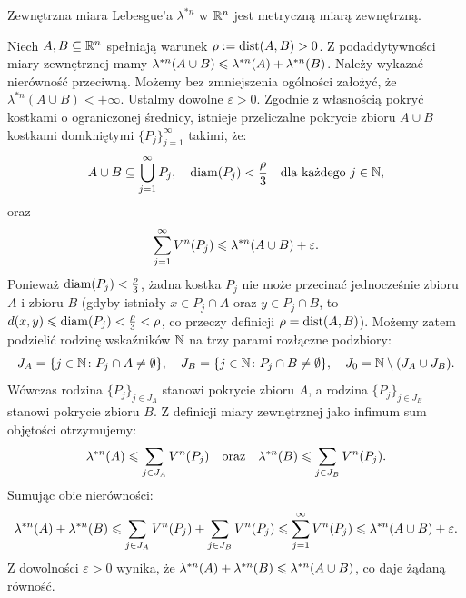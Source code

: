 \begin{tw}

    Zewnętrzna miara Lebesgue'a $\lambda^{*n}$ w $\mathbb{R}^{n}$ jest metryczną miarą zewnętrzną.

\end{tw}
\begin{dow} Niech $A, B \subseteq \mathbb{R}^{n}$ spełniają warunek $\rho := \operatorname{dist}(A, B) > 0$. Z podaddytywności miary zewnętrznej mamy $\lambda^{*n}(A \cup B) \leqslant \lambda^{*n}(A) + \lambda^{*n}(B)$. Należy wykazać nierówność przeciwną. Możemy bez zmniejszenia ogólności założyć, że $\lambda^{*n}(A \cup B) < +\infty$. Ustalmy dowolne $\varepsilon > 0$. Zgodnie z własnością pokryć kostkami o ograniczonej średnicy, istnieje przeliczalne pokrycie zbioru $A \cup B$ kostkami domkniętymi $\{P_j\}_{j=1}^\infty$ takimi, że:
    \begin{equation*}
        A \cup B \subseteq \bigcup_{j=1}^\infty P_j, \quad \operatorname{diam}(P_j) < \frac{\rho}{3} \quad \text{dla każdego } j \in \mathbb{N},
    \end{equation*}
    oraz
    \begin{equation*}
        \sum_{j=1}^\infty V^n(P_j) \leqslant \lambda^{*n}(A \cup B) + \varepsilon.
    \end{equation*}
    Ponieważ $\operatorname{diam}(P_j) < \frac{\rho}{3}$, żadna kostka $P_j$ nie może przecinać jednocześnie zbioru $A$ i zbioru $B$ (gdyby istniały $x \in P_j \cap A$ oraz $y \in P_j \cap B$, to $d(x, y) \leqslant \operatorname{diam}(P_j) < \frac{\rho}{3} < \rho$, co przeczy definicji $\rho = \operatorname{dist}(A, B)$). Możemy zatem podzielić rodzinę wskaźników $\mathbb{N}$ na trzy parami rozłączne podzbiory:
    \begin{equation*}
        J_A = \{j \in \mathbb{N} \colon P_j \cap A \neq \emptyset\}, \quad J_B = \{j \in \mathbb{N} \colon P_j \cap B \neq \emptyset\}, \quad J_0 = \mathbb{N} \setminus (J_A \cup J_B).
    \end{equation*}
    Wówczas rodzina $\{P_j\}_{j \in J_A}$ stanowi pokrycie zbioru $A$, a rodzina $\{P_j\}_{j \in J_B}$ stanowi pokrycie zbioru $B$. Z definicji miary zewnętrznej jako infimum sum objętości otrzymujemy:
    \begin{equation*}
        \lambda^{*n}(A) \leqslant \sum_{j \in J_A} V^n(P_j) \quad \text{oraz} \quad \lambda^{*n}(B) \leqslant \sum_{j \in J_B} V^n(P_j).
    \end{equation*}
    Sumując obie nierówności:
    \begin{equation*}
        \lambda^{*n}(A) + \lambda^{*n}(B) \leqslant \sum_{j \in J_A} V^n(P_j) + \sum_{j \in J_B} V^n(P_j) \leqslant \sum_{j=1}^\infty V^n(P_j) \leqslant \lambda^{*n}(A \cup B) + \varepsilon.
    \end{equation*}
    Z dowolności $\varepsilon > 0$ wynika, że $\lambda^{*n}(A) + \lambda^{*n}(B) \leqslant \lambda^{*n}(A \cup B)$, co daje żądaną równość.
\end{dow}
